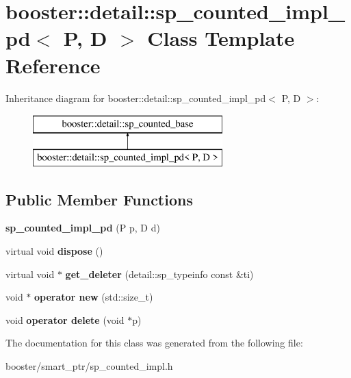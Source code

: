 \section{booster\+:\+:detail\+:\+:sp\+\_\+counted\+\_\+impl\+\_\+pd$<$ P, D $>$ Class Template Reference}
\label{classbooster_1_1detail_1_1sp__counted__impl__pd}
Inheritance diagram for booster\+:\+:detail\+:\+:sp\+\_\+counted\+\_\+impl\+\_\+pd$<$ P, D $>$\+:\begin{figure}[H]
\begin{center}
\leavevmode
\includegraphics[height=2.000000cm]{classbooster_1_1detail_1_1sp__counted__impl__pd}
\end{center}
\end{figure}
\subsection*{Public Member Functions}
\begin{DoxyCompactItemize}
\item 
{\bfseries sp\+\_\+counted\+\_\+impl\+\_\+pd} (P p, D d)\label{classbooster_1_1detail_1_1sp__counted__impl__pd_ad7133d9f3e1ecf5dc77b288a82e406fe}

\item 
virtual void {\bfseries dispose} ()\label{classbooster_1_1detail_1_1sp__counted__impl__pd_aa4eb83d2d7ec6e4bb44016af960ab45b}

\item 
virtual void $\ast$ {\bfseries get\+\_\+deleter} (detail\+::sp\+\_\+typeinfo const \&ti)\label{classbooster_1_1detail_1_1sp__counted__impl__pd_a471cb36a3e637c4c35e990ac59b8f199}

\item 
void $\ast$ {\bfseries operator new} (std\+::size\+\_\+t)\label{classbooster_1_1detail_1_1sp__counted__impl__pd_a6296ead5f1357c0271e642f3fd88be28}

\item 
void {\bfseries operator delete} (void $\ast$p)\label{classbooster_1_1detail_1_1sp__counted__impl__pd_a0d0fedc474695693a827d4da0380190c}

\end{DoxyCompactItemize}


The documentation for this class was generated from the following file\+:\begin{DoxyCompactItemize}
\item 
booster/smart\+\_\+ptr/sp\+\_\+counted\+\_\+impl.\+h\end{DoxyCompactItemize}
